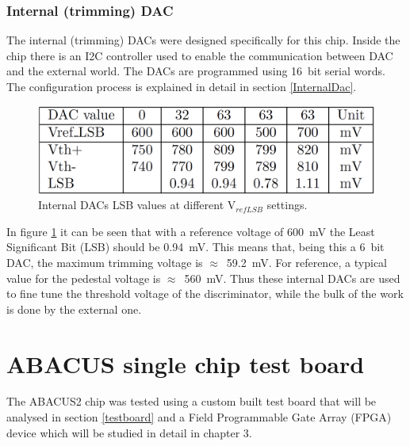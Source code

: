 \subsubsection{Internal (trimming) DAC}
The internal (trimming) DACs were designed specifically for this chip.
Inside the chip there is an I2C controller used to enable the communication between DAC and the external world.
The DACs are programmed using 16~bit serial words.
The configuration process is explained in detail in section \ref{InternalDac}.
\begin{figure}[H]
	\centering
	\includegraphics[width=0.5\linewidth]{IMG/ch2/INTDACTABLE}
	\caption{Internal DACs LSB values at different V$_{refLSB}$ settings.}
	\label{fig:intdactable}
\end{figure}
\noindent In figure \ref{fig:intdactable} it can be seen that with a reference voltage of 600~mV the Least Significant Bit (LSB) should be 0.94~mV.
This means that, being this a 6~bit DAC, the maximum trimming voltage is $\approx$~59.2~mV.
For reference, a typical value for the pedestal voltage is $\approx$~560~mV.
Thus these internal DACs are used to fine tune the threshold voltage of the discriminator, while the bulk of the work is done by the external one.   

\section{ABACUS single chip test board}
The ABACUS2 chip was tested using a custom built test board that will be analysed in section \ref{testboard} and a Field Programmable Gate Array (FPGA) device which will be studied in detail in chapter 3.

